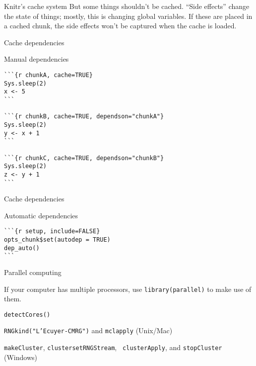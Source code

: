 \documentclass[12pt,t]{beamer}
\begin{document}
{\begin{frame}[fragile]{Knitr's cache system}
{  But some things {\nvhilit shouldn't} be cached. ``Side effects''
  change the state of things; mostly, this is changing global
  variables. If these are placed in a cached chunk, the side effects
  won't be captured when the cache is loaded.
}
\end{frame}




\begin{frame}[fragile]{Cache dependencies}

\vspace{18pt}

Manual dependencies
\bigskip

\begin{lstlisting}
```{r chunkA, cache=TRUE}
Sys.sleep(2)
x <- 5
```

```{r chunkB, cache=TRUE, dependson="chunkA"}
Sys.sleep(2)
y <- x + 1
```

```{r chunkC, cache=TRUE, dependson="chunkB"}
Sys.sleep(2)
z <- y + 1
```
\end{lstlisting}

\end{frame}


\begin{frame}[fragile]{Cache dependencies}

\vspace{18pt}

Automatic dependencies
\bigskip

\begin{lstlisting}
```{r setup, include=FALSE}
opts_chunk$set(autodep = TRUE)
dep_auto()
```
\end{lstlisting}


\end{frame}





\begin{frame}{Parallel computing}

\vspace{18pt}

If your computer has multiple processors, use {\tt library(parallel)}
to make use of them.

\bbi
\item {\tt detectCores()}
\item {\tt \hilit RNGkind("L'Ecuyer-CMRG")} and {\tt \hilit mclapply} (Unix/Mac)
\item {\tt \hilit makeCluster}, {\tt \hilit clustersetRNGStream}, {\tt
  \hilit clusterApply}, and {\tt \hilit stopCluster} (Windows)
\ei


\end{frame}}
\end{document}

